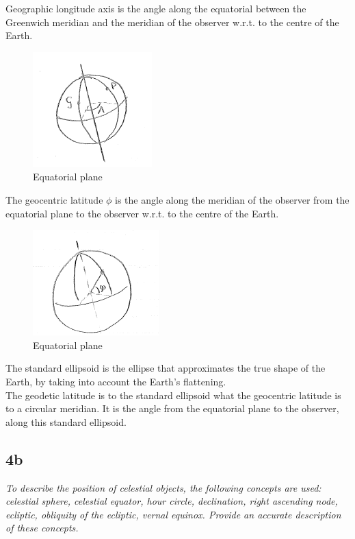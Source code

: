 Geographic longitude axis is the angle along the equatorial between the Greenwich meridian and the meridian of the observer w.r.t. to the centre of the Earth.
\begin{figure}[H]
    \centering
    \includegraphics[width=0.3\columnwidth]{Figures/4a3.png}
    \caption{Equatorial plane}
    \label{fig:4a3}
\end{figure}

The geocentric latitude $\phi$ is the angle along the meridian of the observer from the equatorial plane to the observer w.r.t. to the centre of the Earth.
\begin{figure}[H]
    \centering
    \includegraphics[width=0.3\columnwidth]{Figures/4a4.png}
    \caption{Equatorial plane}
    \label{fig:4a4}
\end{figure}

The standard ellipsoid is the ellipse that approximates the true shape of the Earth, by taking into account the Earth's flattening. \\

The geodetic latitude is to the standard ellipsoid what the geocentric latitude is to a circular meridian. It is the angle from the equatorial plane to the observer, along this standard ellipsoid.\\

\subsection{4b}
\textit{To describe the position of celestial objects, the following concepts are used: celestial sphere, celestial equator, hour circle, declination, right ascending node, ecliptic, obliquity of the ecliptic, vernal equinox. Provide an accurate description of these concepts.} \\

